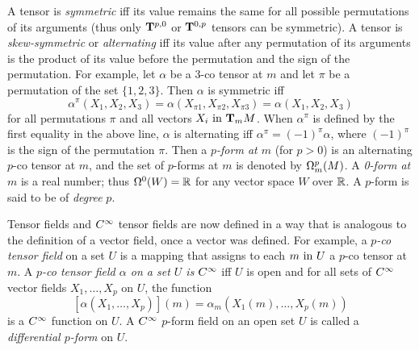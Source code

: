 \documentclass[../main]{subfiles}
\begin{document}
A tensor is \emph{symmetric} iff its value remains the same for all possible permutations of its arguments (thus only $\tensorbundle{}{p}{ 0}$ or $\tensorbundle{}{0}{ p}$ tensors can be symmetric). A tensor is \emph{skew-symmetric} or \emph{alternating} iff its value after any permutation of its arguments is the product of its value before the permutation and the sign of the permutation. For example, let $\alpha$ be a 3-co tensor at $m$ and let $\pi$ be a permutation of the set $\{1, 2, 3\}$. Then $\alpha$ is symmetric iff 
\[\alpha^\pi(X_1, X_2, X_3) = \alpha(X_{\pi 1}, X_{\pi 2}, X_{\pi 3})= \alpha(X_1, X_2, X_3)\]
for all permutations $\pi$ and all vectors $X_i \InText \tangentspace{M}{m}$. When $\alpha^\pi$ is defined by the first equality in the above line, $\alpha$ is alternating iff $\alpha^\pi = (-1)^\pi \alpha$, where $(-1)^\pi$ is the sign of the permutation $\pi$. Then a \emph{$p$-form at $m$} (for $p>0$) is an alternating $p$-co tensor at $m$, and the set of $p$-forms at $m$ is denoted by $\formspace{M}{m}{p}$. A \emph{0-form at $m$} is a real number; thus $\formbundle{W}{0} = \bR$ for any vector space $W$ over $\bR$. A $p$-form is said to be of \emph{degree} $p$. 

Tensor fields and $\CInfty$ tensor fields are now defined in a way that is analogous to the definition of a vector field, once a vector was defined. For example, a \emph{$p$-co tensor field} on a set $U$ is a mapping that assigns to each $m \InText U$ a $p$-co tensor at $m$. A \emph{$p$-co tensor field $\alpha$ on a set $U$ is $\CInfty$} iff $U$ is open and for all sets of $\CInfty$ vector fields $X_1,\dots,X_p$ on $U$, the function 
\[ [\alpha(X_1,\dots,X_p)](m) = \alpha_m(X_1(m),\dots,X_p(m)) \]
is a $\CInfty$ function on $U$. A $\CInfty$ $p$-form field on an open set $U$ is called a \emph{differential $p$-form} on $U$. 
\end{document}

